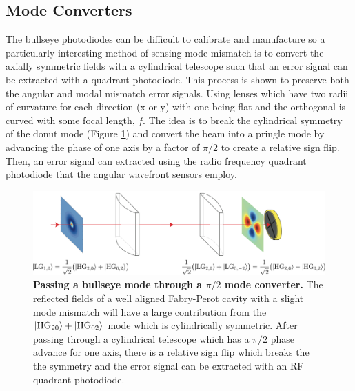\subsection{Mode Converters}
	The bullseye photodiodes can be difficult to calibrate and manufacture so a particularly interesting method of sensing mode mismatch is to convert the axially symmetric fields with a cylindrical telescope such that an error signal can be extracted with a quadrant photodiode.  This process is shown to preserve both the angular and modal mismatch error signals.  Using lenses which have two radii of curvature for each direction (x or y) with one being flat and the orthogonal is curved with some focal length, $f$.  The idea is to break the cylindrical symmetry of the donut mode (Figure \ref{fig:ModeConv}) and convert the beam into a pringle mode by advancing the phase of one axis by a factor of $\pi/2$ to create a relative sign flip.  Then, an error signal can extracted using the radio frequency quadrant photodiode that the angular wavefront sensors employ.
	
	\begin{figure}[h]
		\centering
		\includegraphics[width=1.0 \textwidth]{../Figures/ModeConv.png}
		\caption[Passing a bullseye mode through a $\pi/2$ mode converter.]
		{\textbf{Passing a bullseye mode through a $\pi/2$ mode converter.} The reflected fields of a well aligned Fabry-Perot cavity with a slight mode mismatch will have a large contribution from the $\ket{\text{HG}_{20}} + \ket{\text{HG}_{02}}$ mode which is cylindrically symmetric.  After passing through a cylindrical telescope which has a $\pi/2$ phase advance for one axis, there is a relative sign flip which breaks the the symmetry and the error signal can be extracted with an RF quadrant photodiode.
		}
		\label{fig:ModeConv}
	\end{figure}

